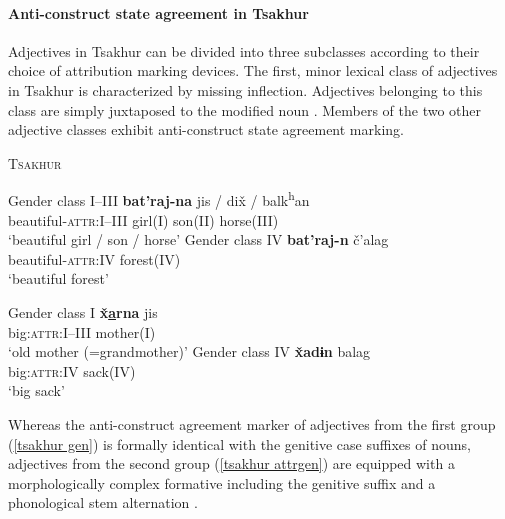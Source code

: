 \paragraph{Anti-construct state agreement in Tsakhur}
Adjectives in Tsakhur can be divided into three subclasses according to their choice of attribution marking devices. The first, minor lexical class of adjectives in Tsakhur is characterized by missing inflection. Adjectives belonging to this class are simply juxtaposed to the modified noun \citep[383]{talibov2004}. Members of the two other adjective classes exhibit anti-construct state agreement marking.
\begin{exe}
\ex \textsc{Tsakhur} \citep[382]{talibov2004}
\begin{xlist}
\ex	\label{tsakhur gen}
\begin{xlist}
\ex	Gender class I–III
\gll	\textbf{bat'raj-na} jis / dix̌ / balk\textsuperscript{h}an\\
	 beautiful-\textsc{attr:I–III} girl(\textsc{I}) { } son(\textsc{II}) { } horse(\textsc{III})\\
\glt	 ‘beautiful girl / son / horse’
\ex	Gender class IV
\gll	\textbf{bat'raj-n}	č'alag\\
	beautiful-\textsc{attr:IV} forest(\textsc{IV})\\
\glt	‘beautiful forest’
\end{xlist}
\ex \label{tsakhur attrgen}
\begin{xlist}
\ex	Gender class I
\gll	\textbf{x̌\underline{a}rna} jis\\
	big:\textsc{attr:I–III} mother(\textsc{I})\\
\glt	‘old mother (=grandmother)’
\ex	Gender class IV
\gll	\textbf{x̌adɨn} balag\\
	big:\textsc{attr:IV} sack(\textsc{IV})\\
\glt	‘big sack’
\end{xlist}
\end{xlist}
\end{exe}
Whereas the anti-construct agreement marker of adjectives from the first group (\ref{tsakhur gen}) is formally identical with the genitive case suffixes of nouns, adjectives from the second group (\ref{tsakhur attrgen}) are equipped with a morphologically complex formative including the genitive suffix and a phonological stem alternation \citep[382]{talibov2004}.

